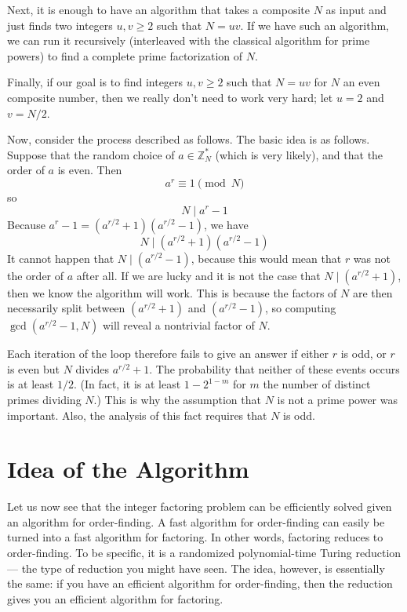 Next, it is enough to have an algorithm that takes a composite $N$ as input and just finds two integers $u, v \geq 2$ such that $N = uv$. If we have such an algorithm, we can run it recursively (interleaved with the classical algorithm for prime powers) to find a complete prime factorization of $N$.

Finally, if our goal is to find integers $u, v \geq 2$ such that $N = uv$ for $N$ an even composite number, then we really don't need to work very hard; let $u = 2$ and $v = N/2$.

Now, consider the process described as follows. The basic idea is as follows. Suppose that the random choice of $a \in \mathbb{Z}_N^*$ (which is very likely), and that the order of $a$ is even. Then
\[
a^r \equiv 1 \pmod{N}
\]
so
\[
N \mid a^r - 1
\]
Because $a^r - 1 = (a^{r/2} + 1)(a^{r/2} - 1)$, we have
\[
N \mid (a^{r/2} + 1)(a^{r/2} - 1)
\]
It cannot happen that $N \mid (a^{r/2} - 1)$, because this would mean that $r$ was not the order of $a$ after all. If we are lucky and it is not the case that $N \mid (a^{r/2} + 1)$, then we know the algorithm will work. This is because the factors of $N$ are then necessarily split between $(a^{r/2} + 1)$ and $(a^{r/2} - 1)$, so computing $\gcd(a^{r/2} - 1, N)$ will reveal a nontrivial factor of $N$.

Each iteration of the loop therefore fails to give an answer if either $r$ is odd, or $r$ is even but $N$ divides $a^{r/2} + 1$. The probability that neither of these events occurs is at least $1/2$. (In fact, it is at least $1 - 2^{1 - m}$ for $m$ the number of distinct primes dividing $N$.) This is why the assumption that $N$ is not a prime power was important. Also, the analysis of this fact requires that $N$ is odd.


\section{Idea of the Algorithm}

Let us now see that the integer factoring problem can be efficiently solved given an algorithm for order-finding. A fast algorithm for order-finding can easily be turned into a fast algorithm for factoring. In other words, factoring reduces to order-finding. To be specific, it is a randomized polynomial-time Turing reduction — the type of reduction you might have seen. The idea, however, is essentially the same: if you have an efficient algorithm for order-finding, then the reduction gives you an efficient algorithm for factoring.

